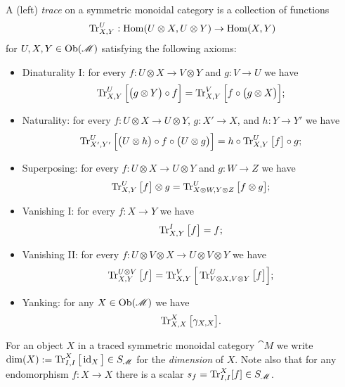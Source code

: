 A (left) \emph{trace} on a symmetric monoidal category is a collection of functions 
\[\operatorname{Tr}^U_{X,Y}:\operatorname{Hom}(U\otimes X,U\otimes Y)\to\operatorname{Hom}(X,Y)\]
for $U,X,Y\in\operatorname{Ob}(\mathscr{M})$ satisfying the following axioms:
\begin{itemize}
 \item Dinaturality I: for every $f:U\otimes X\to V\otimes Y$ and $g:V\to U$ we have
 \[\operatorname{Tr}^U_{X,Y}\Big[\big(g\otimes Y\big)\circ f\Big]=\operatorname{Tr}^V_{X,Y}\Big[f\circ\big(g\otimes X\big)\Big];\] 
 \item Naturality: for every $f:U\otimes X\to U\otimes Y$, $g:X'\to X$, and $h:Y\to Y'$ we have
 \[\operatorname{Tr}^U_{X',Y'}\Big[\big(U\otimes h\big)\circ f\circ\big(U\otimes g\big)\Big]=h\circ\operatorname{Tr}^U_{X,Y}\big[f\big]\circ g;\]
 \item Superposing: for every $f:U\otimes X\to U\otimes Y$ and $g:W\to Z$ we have
 \[\operatorname{Tr}^U_{X,Y}\big[f\big]\otimes g=\operatorname{Tr}^U_{X\otimes W,Y\otimes Z}\big[f\otimes g\big];\]
 \item Vanishing I: for every $f:X\to Y$ we have
 \[\operatorname{Tr}^{I}_{X,Y}\big[f\big]=f;\]
 \item Vanishing II: for every $f:U\otimes V\otimes X\to U\otimes V\otimes Y$ we have
 \[\operatorname{Tr}^{U\otimes V}_{X,Y}\big[f\big]=\operatorname{Tr}^V_{X,Y}\Big[\operatorname{Tr}^U_{V\otimes X,V\otimes Y}\big[f\big]\Big];\]
 \item Yanking: for any $X\in\operatorname{Ob}(\mathscr{M})$ we have
 \[\operatorname{Tr}^X_{X,X}\big[\gamma_{X,X}\big].\]
\end{itemize}

For an object $X$ in a traced symmetric monoidal category $\cat{M}$ we write $\dim(X):=\operatorname{Tr}^X_{I,I}\big[\operatorname{id}_X\big]\in S_{\mathscr{M}}$ for the {\em dimension} of $X$.  Note also that for any endomorphism $f:X\to X$ there is a scalar $s_f=\operatorname{Tr}^X_{I,I}[f]\in S_{\mathscr{M}}$.

